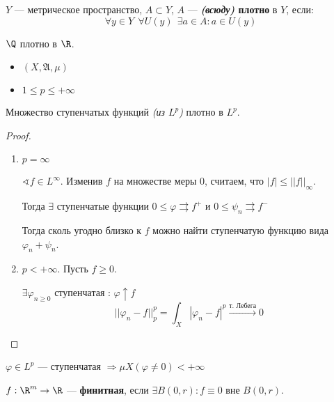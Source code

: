 \begin{theorem}
    \(Y\) --- метрическое пространство, \(A \subset Y\), \(A\) --- \textbf{\textit{(всюду)} плотно} в \(Y\), если:
    \[\forall y\in Y \ \ \forall U(y) \ \ \exists a \in A : a\in U(y)\]
\end{theorem}
\begin{example}
    \(\Q\) плотно в \(\R\).
\end{example}

\begin{lemma}\itemfix
    \begin{itemize}
        \item \((X, \mathfrak{A}, \mu)\)
        \item \(1 \leq p \leq +\infty\)
    \end{itemize}

    Множество ступенчатых функций \textit{(из \(L^p\))} плотно в \(L^p\).
\end{lemma}
\begin{proof}\itemfix
    \begin{enumerate}
        \item \(p = \infty\)

              \(\sphericalangle f\in L^{\infty}\). Изменив \(f\) на множестве меры \(0\), считаем, что \(|f| \leq ||f||_\infty\).

              Тогда \(\exists \) ступенчатые функции \(0 \leq \varphi \rightrightarrows f^{ +}\) и \(0 \leq \psi_n \rightrightarrows f^{ -}\)


              Тогда сколь угодно близко к \(f\) можно найти ступенчатую функцию вида \(\varphi_n + \psi_n\).

        \item \(p < +\infty\). Пусть \(f \geq 0\).

              \(\exists \varphi_{n \geq 0}\) ступенчатая : \(\varphi \uparrow f\)
              \[||\varphi_n - f||_p^p = \int_X |\varphi_n - f|^p \xrightarrow{\text{т. Лебега}} 0\]
    \end{enumerate}
\end{proof}
\begin{remark}
    \(\varphi \in L^p\) --- ступенчатая \( \Rightarrow \mu X (\varphi \neq 0) < +\infty\)
\end{remark}

\begin{definition}
    \(f : \R^m \to \R\) --- \textbf{финитная}, если \(\exists B(0, r) : f\equiv 0\) вне \(B(0, r)\).
\end{definition}

